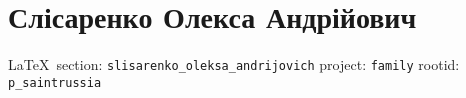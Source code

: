  
 
\section{Слісаренко Олекса Андрійович}
 
\vspace{0.5cm}
 {\ifDEBUG\small\LaTeX~section: \verb|slisarenko_oleksa_andrijovich| project: \verb|family| rootid: \verb|p_saintrussia| \fi}
\vspace{0.5cm}
  
 
